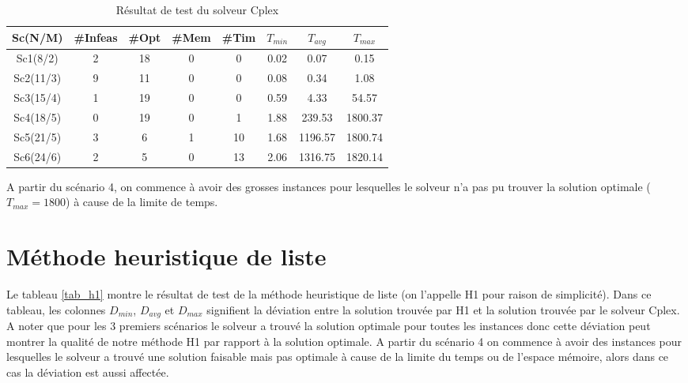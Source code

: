 \begin{table}[h]
    \centering
    \begin{tabular}{|c|c|c|c|c|c|c|c|}
    	\hline
    	Sc(N/M)	& \#Infeas & \#Opt	& \#Mem & \#Tim & $T_{min}$ & $T_{avg}$	& $T_{max}$ \\ \hline
		Sc1(8/2) & 2 & 18 & 0 & 0 &  0.02 &  0.07 &  0.15 \\ \hline
		Sc2(11/3) & 9 & 11 & 0 & 0 &  0.08 &  0.34 &  1.08 \\ \hline
		Sc3(15/4) & 1 & 19 & 0 & 0 &  0.59 &  4.33 &  54.57 \\ \hline
		Sc4(18/5) & 0 & 19 & 0 & 1 &  1.88 &  239.53 &  1800.37 \\ \hline
		Sc5(21/5) & 3 & 6 & 1 & 10 &  1.68 &  1196.57 &  1800.74 \\ \hline
		Sc6(24/6) & 2 & 5 & 0 & 13 &  2.06 &  1316.75 &  1820.14 \\	\hline
    \end{tabular}
    \caption{Résultat de test du solveur Cplex}
    \label{tab_cplex}
\end{table}
\bigskip

A partir du scénario 4, on commence à avoir des grosses instances pour lesquelles le solveur n'a pas pu trouver la solution optimale ($T_{max}=1800$) à cause de la limite de temps.

\section{Méthode heuristique de liste}
Le tableau \ref{tab_h1} montre le résultat de test de la méthode heuristique de liste (on l'appelle H1 pour raison de simplicité). Dans ce tableau, les colonnes $D_{min}$, $D_{avg}$ et $D_{max}$ signifient la déviation entre la solution trouvée par H1 et la solution trouvée par le solveur Cplex. A noter que pour les 3 premiers scénarios le solveur a trouvé la solution optimale pour toutes les instances donc cette déviation peut montrer la qualité de notre méthode H1 par rapport à la solution optimale. A partir du scénario 4 on commence à avoir des instances pour lesquelles le solveur a trouvé une solution faisable mais pas optimale à cause de la limite du temps ou de l'espace mémoire, alors dans ce cas la déviation est aussi affectée.

